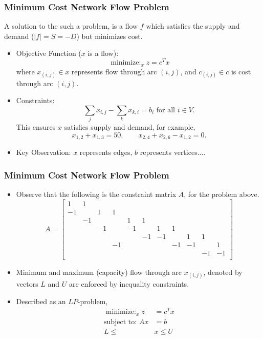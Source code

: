 \documentclass{beamer}
\begin{document}
	\begin{frame}
		\frametitle{Minimum Cost Network Flow Problem}
		A solution to the such a problem, is a flow $f$ which satisfies the supply and demand ($|f| = S = -D$) but minimizes cost. 
		\begin{itemize}
			\item Objective Function ($x$ is a flow):
			\begin{equation*}
				\mathop{\text{minimize: }}_{x}  z = c^Tx
			\end{equation*}
			where $x_{(i, j)} \in x$ represents flow through arc $(i, j)$, and $c_{(i, j)} \in c$ is cost through arc $(i, j)$. 
			\vfill
			\item Constraints:
			\begin{equation*}
				\sum_{j}x_{i, j} - \sum_{k}x_{k, i} = b_i \text{ for all $i \in V$}. 
			\end{equation*}
			This ensures $x$ satisfies supply and demand, for example,
				\begin{equation*}
					x_{1, 2} + x_{1,3} = 50,
					\qquad x_{2, 4} + x_{2, 6} - x_{1, 2} = 0.
				  \end{equation*}
			\item Key Observation: $x$ represents edges, $b$ represents vertices....
		\end{itemize}
	\end{frame}

	\begin{frame}
		\frametitle{Minimum Cost Network Flow Problem}
		\begin{itemize}
			\item Observe that the following is the constraint matrix $A$, for the problem above. 
			\begin{equation*}
				A = 
				\begin{bmatrix}
					1 & 1  &    &    &    &    &    &    &    &    &   \\
					-1 &    & 1  & 1  &    &    &    &    &    &    &  \\
					& -1 &    &    & 1  & 1  &    &    &    &    &  \\
					&    & -1 &    & -1 &    & 1  & 1  &    &    &  \\
					&    &    &    &    & -1 & -1 &    & 1  & 1  &  \\
					&    &    & -1 &    &    &    & -1 & -1 &    & 1\\
					&    &    &    &    &    &    &    &    & -1 & -1\\
				\end{bmatrix}
			\end{equation*}
			\item Minimum and maximum (capacity) flow through arc $x_{(i, j)}$, denoted by vectors $L$ and $U$ are enforced by inequality constraints. 
			\item Described as an $LP$-problem, 
			\begin{align*}
				\mathop{\text{minimize: }}_{x}  z &= c^Tx\\
			  \text{subject to: }Ax &= b\\
			  L \leq&x\leq U
			\end{align*}
		\end{itemize}
	\end{frame}
\end{document}
